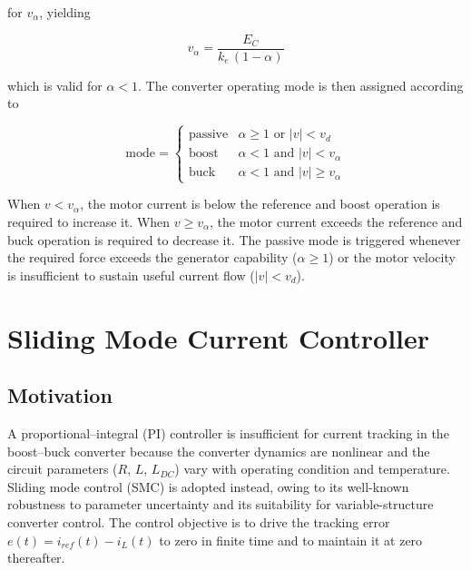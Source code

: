 for $v_\alpha$, yielding

\begin{equation}
    v_\alpha = \frac{E_C}{k_e\,(1-\alpha)}
    \label{eq:valpha}
\end{equation}

which is valid for $\alpha < 1$. The converter operating mode is then
assigned according to

\begin{equation}
    \text{mode} =
    \begin{cases}
        \text{passive} & \alpha \geq 1 \text{ or } |v| < v_d \\[4pt]
        \text{boost}   & \alpha < 1 \text{ and } |v| < v_\alpha \\[4pt]
        \text{buck}    & \alpha < 1 \text{ and } |v| \geq v_\alpha
    \end{cases}
    \label{eq:mode}
\end{equation}

When $v < v_\alpha$, the motor current is below the reference and boost
operation is required to increase it. When $v \geq v_\alpha$, the
motor current exceeds the reference and buck operation is required to
decrease it. The passive mode is triggered whenever the required force
exceeds the generator capability ($\alpha \geq 1$) or the motor
velocity is insufficient to sustain useful current flow ($|v| < v_d$).


\section{Sliding Mode Current Controller}
\label{sec:smc}

\subsection{Motivation}
\label{subsec:motivation}

A proportional--integral (PI) controller is insufficient for current
tracking in the boost--buck converter because the converter dynamics
are nonlinear and the circuit parameters ($R$, $L$, $L_{DC}$) vary
with operating condition and temperature. Sliding mode control (SMC)
is adopted instead, owing to its well-known robustness to parameter
uncertainty and its suitability for variable-structure converter
control. The control objective is to drive the tracking error
$e(t) = i_{ref}(t) - i_L(t)$ to zero in finite time and to maintain
it at zero thereafter.

